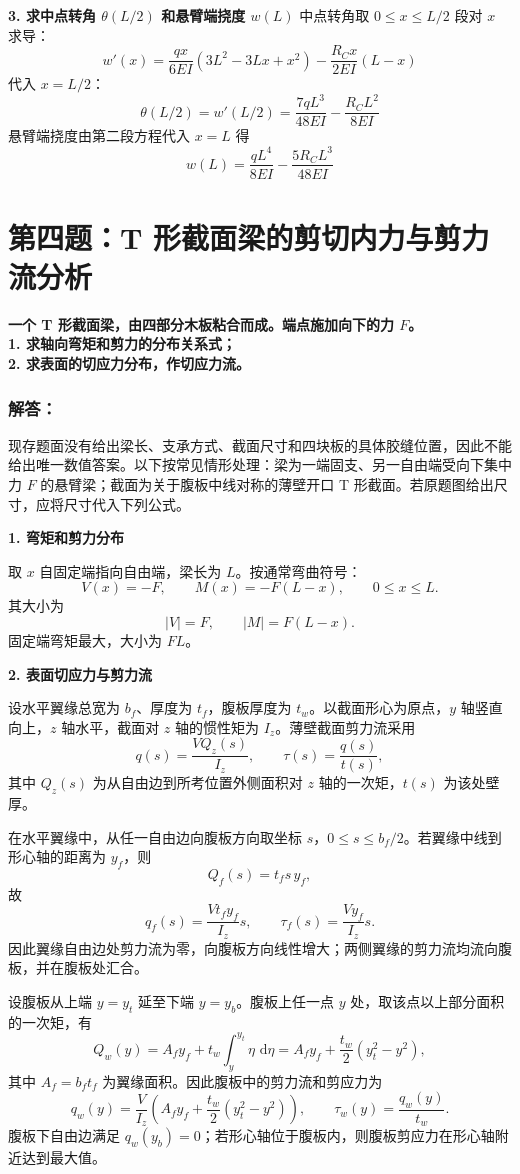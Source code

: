 \documentclass[11pt,a4paper]{ctexrep}
\newcommand{\diff}{\,\mathrm{d}}
\begin{document}
{\textbf{3. 求中点转角 $\theta(L/2)$ 和悬臂端挠度 $w(L)$}
中点转角取 $0 \le x \le L/2$ 段对 $x$ 求导：
  \[
  w'(x) = \frac{qx}{6EI}(3L^2 - 3Lx + x^2) - \frac{R_C x}{2EI}(L - x)
  \]
  代入 $x = L/2$：
  \[
  \theta(L/2) = w'(L/2) = \frac{7 q L^3}{48 EI} - \frac{R_C L^2}{8 EI}
  \]
悬臂端挠度由第二段方程代入 $x = L$ 得
  \[
  w(L) = \frac{q L^4}{8 EI} - \frac{5 R_C L^3}{48 EI}
  \]




\section*{第四题：T 形截面梁的剪切内力与剪力流分析}

\textbf{一个 T 形截面梁，由四部分木板粘合而成。端点施加向下的力 $F$。}\\
\textbf{1. 求轴向弯矩和剪力的分布关系式；}\\
\textbf{2. 求表面的切应力分布，作切应力流。}

\subsubsection*{解答：}

现存题面没有给出梁长、支承方式、截面尺寸和四块板的具体胶缝位置，因此不能给出唯一数值答案。以下按常见情形处理：梁为一端固支、另一自由端受向下集中力 $F$ 的悬臂梁；截面为关于腹板中线对称的薄壁开口 T 形截面。若原题图给出尺寸，应将尺寸代入下列公式。

\textbf{1. 弯矩和剪力分布}

取 $x$ 自固定端指向自由端，梁长为 $L$。按通常弯曲符号：
\[
V(x)=-F,\qquad M(x)=-F(L-x),\qquad 0\le x\le L.
\]
其大小为
\[
|V|=F,\qquad |M|=F(L-x).
\]
固定端弯矩最大，大小为 $FL$。

\textbf{2. 表面切应力与剪力流}

设水平翼缘总宽为 $b_f$、厚度为 $t_f$，腹板厚度为 $t_w$。以截面形心为原点，$y$ 轴竖直向上，$z$ 轴水平，截面对 $z$ 轴的惯性矩为 $I_z$。薄壁截面剪力流采用
\[
q(s)=\frac{VQ_z(s)}{I_z},\qquad \tau(s)=\frac{q(s)}{t(s)},
\]
其中 $Q_z(s)$ 为从自由边到所考位置外侧面积对 $z$ 轴的一次矩，$t(s)$ 为该处壁厚。

在水平翼缘中，从任一自由边向腹板方向取坐标 $s$，$0\le s\le b_f/2$。若翼缘中线到形心轴的距离为 $y_f$，则
\[
Q_f(s)=t_f s\,y_f,
\]
故
\[
q_f(s)=\frac{Vt_f y_f}{I_z}s,\qquad
\tau_f(s)=\frac{Vy_f}{I_z}s.
\]
因此翼缘自由边处剪力流为零，向腹板方向线性增大；两侧翼缘的剪力流均流向腹板，并在腹板处汇合。

设腹板从上端 $y=y_t$ 延至下端 $y=y_b$。腹板上任一点 $y$ 处，取该点以上部分面积的一次矩，有
\[
Q_w(y)=A_f y_f+t_w\int_y^{y_t}\eta\,\diff\eta
      =A_f y_f+\frac{t_w}{2}(y_t^2-y^2),
\]
其中 $A_f=b_f t_f$ 为翼缘面积。因此腹板中的剪力流和剪应力为
\[
q_w(y)=\frac{V}{I_z}
\left(A_f y_f+\frac{t_w}{2}(y_t^2-y^2)\right),
\qquad
\tau_w(y)=\frac{q_w(y)}{t_w}.
\]
腹板下自由边满足 $q_w(y_b)=0$；若形心轴位于腹板内，则腹板剪应力在形心轴附近达到最大值。

}
\end{document}
